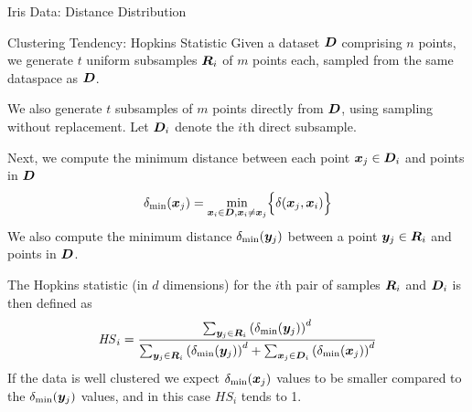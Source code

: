 \begin{frame}[fragile]{Iris Data: Distance Distribution}
\begin{figure}
  \centering
  \captionsetup[subfloat]{captionskip=30pt}
    \def\pshlabel#1{ {\footnotesize #1}}
    \def\psvlabel#1{ {\footnotesize #1}}
    \centerline{
    }
\end{figure}
\end{frame}



\begin{frame}{Clustering Tendency: Hopkins Statistic}
Given a dataset ${\boldsymbol D}$ comprising $n$ points,
we generate $t$ uniform subsamples ${\boldsymbol R}_i$ of $m$ points each, 
sampled from the same dataspace as ${\boldsymbol D}$.

\medskip
We also generate $t$ subsamples of $m$ points
directly from ${\boldsymbol D}$, using sampling without replacement. Let ${\boldsymbol D}_i$
denote the $i$th direct subsample. 

\medskip
Next, we compute the minimum distance
between each point ${\boldsymbol x}_{j} \in {\boldsymbol D}_i$ and points in ${\boldsymbol D}$
\begin{align*}
  \delta_{\min}({\boldsymbol x}_{j}) = \min_{{\boldsymbol x}_i \in {\boldsymbol D}, {\boldsymbol x}_i \ne {\boldsymbol x}_{j}}
  \Bigl\{\delta({\boldsymbol x}_{j}, {\boldsymbol x}_i)\Bigr\}
\end{align*}
We
also compute the minimum distance $\delta_{\min}({\boldsymbol y}_{j})$
between a point ${\boldsymbol y}_{j} \in {\boldsymbol R}_i$ and
points in ${\boldsymbol D}$.

\medskip
The Hopkins statistic (in $d$ dimensions) for the $i$th pair of samples ${\boldsymbol R}_i$ and ${\boldsymbol D}_i$ is then def\/{i}ned as
\begin{align*}
  \mathit{HS}_i = \frac{\sum_{{\boldsymbol y}_{j} \in {\boldsymbol R}_i} \left(\delta_{\min}({\boldsymbol y}_{j})\right)^d}
  {\sum_{{\boldsymbol y}_{j} \in {\boldsymbol R}_i} \left(\delta_{\min}({\boldsymbol y}_{j})\right)^d +
  \sum_{{\boldsymbol x}_{j} \in {\boldsymbol D}_i} \left(\delta_{\min}({\boldsymbol x}_{j})\right)^d}
\end{align*}
If the data is well clustered we expect $\delta_{\min}({\boldsymbol x}_{j})$ values to
be smaller compared to the $\delta_{\min}({\boldsymbol y}_{j})$ values, and in this
case $\mathit{HS}_i$ tends to 1. 
\end{frame}


